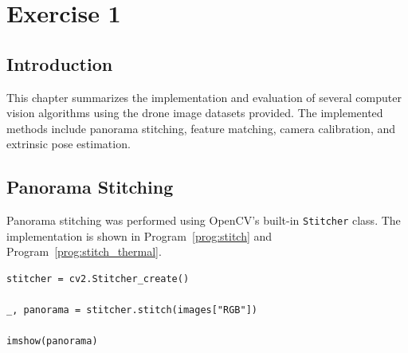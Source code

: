 \chapter{Exercise 1}

\section{Introduction}

This chapter summarizes the implementation and evaluation of several computer vision algorithms using the drone image datasets provided. The implemented methods include panorama stitching, feature matching, camera calibration, and extrinsic pose estimation.


\section{Panorama Stitching}

Panorama stitching was performed using OpenCV's built-in \texttt{Stitcher} class. The implementation is shown in Program~\ref{prog:stitch} and Program~\ref{prog:stitch_thermal}.

\begin{program}[H]
\caption{Panorama stitching using OpenCV}
\label{prog:stitch}
\begin{verbatim}
stitcher = cv2.Stitcher_create()

_, panorama = stitcher.stitch(images["RGB"])

imshow(panorama)
\end{verbatim}
\end{program}


